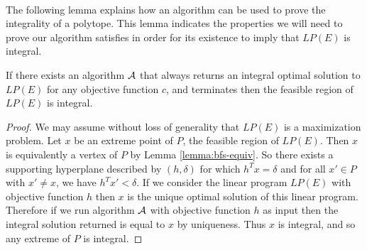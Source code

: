 \paragraph{}
The following lemma explains how an algorithm can be used to prove the integrality of a polytope. This lemma indicates the properties we will need to prove our algorithm satisfies in order for its existence to imply that $LP(E)$ is integral.
\begin{lemma} If there exists an algorithm $\mathcal{A}$ that always returns an integral optimal solution to $LP(E)$ for any objective function $c$, and terminates then the feasible region of $LP(E)$ is integral.
\end{lemma}
\begin{proof}
We may assume without loss of generality that $LP(E)$ is a maximization problem. Let $x$ be an extreme point of $P$, the feasible region of $LP(E)$. Then $x$ is equivalently a vertex of $P$ by Lemma \ref{lemma:bfs-equiv}. So there exists a supporting hyperplane described by $(h,\delta)$ for which $h^Tx = \delta$ and for all $x' \in P$ with $x' \neq x$, we have $h^Tx' < \delta$. If we consider the linear program $LP(E)$ with objective function $h$ then $x$ is the unique optimal solution of this linear program. Therefore if we run algorithm $\mathcal{A}$  with objective function $h$ as input then the integral solution returned is equal to $x$ by uniqueness. Thus $x$ is integral, and so any extreme of $P$ is integral. 
\end{proof}
